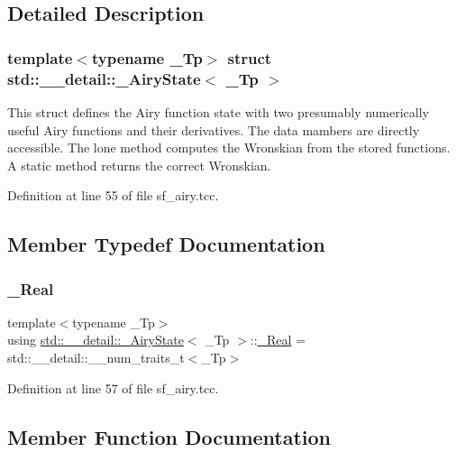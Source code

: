 \subsection{Detailed Description}
\subsubsection*{template$<$typename \+\_\+\+Tp$>$\newline
struct std\+::\+\_\+\+\_\+detail\+::\+\_\+\+Airy\+State$<$ \+\_\+\+Tp $>$}

This struct defines the Airy function state with two presumably numerically useful Airy functions and their derivatives. The data mambers are directly accessible. The lone method computes the Wronskian from the stored functions. A static method returns the correct Wronskian. 

Definition at line 55 of file sf\+\_\+airy.\+tcc.



\subsection{Member Typedef Documentation}
\mbox{\label{structstd_1_1____detail_1_1__AiryState_a8fc5c7c19e6dd8f25f1e4103f74c0a3b}} 
\subsubsection{\texorpdfstring{\+\_\+\+Real}{\_Real}}
{\footnotesize\ttfamily template$<$typename \+\_\+\+Tp$>$ \\
using \hyperlink{structstd_1_1____detail_1_1__AiryState}{std\+::\+\_\+\+\_\+detail\+::\+\_\+\+Airy\+State}$<$ \+\_\+\+Tp $>$\+::\hyperlink{structstd_1_1____detail_1_1__AiryState_a8fc5c7c19e6dd8f25f1e4103f74c0a3b}{\+\_\+\+Real} =  std\+::\+\_\+\+\_\+detail\+::\+\_\+\+\_\+num\+\_\+traits\+\_\+t$<$\+\_\+\+Tp$>$}



Definition at line 57 of file sf\+\_\+airy.\+tcc.



\subsection{Member Function Documentation}
\mbox{\label{structstd_1_1____detail_1_1__AiryState_a6c519145b38f24b2dab705fbc23f49d6}} 
